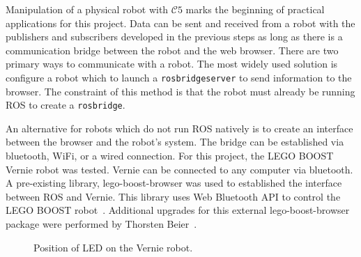         Manipulation of a physical robot with $\mathcal{C}5$ marks the beginning of practical applications for this project. Data can be sent and received from a robot with the publishers and subscribers developed in the previous steps as long as there is a communication bridge between the robot and the web browser. There are two primary ways to communicate with a robot. The most widely used solution is configure a robot which to launch a \texttt{rosbridge\smallunderscore server} to send information to the browser. The constraint of this method is that the robot must already be running \ac{ROS} to create a \texttt{rosbridge}.

        An alternative for robots which do not run \ac{ROS} natively is to create an interface between the browser and the robot's system. The bridge can be established via bluetooth, WiFi, or a wired connection. For this project, the LEGO BOOST Vernie robot was tested. Vernie can be connected to any computer via bluetooth. A pre-existing library, \textsf{lego-boost-browser} was used to established the interface between \ac{ROS} and Vernie. This library uses Web Bluetooth \ac{API} to control the LEGO BOOST robot~\cite{boosted}.  Additional upgrades for this external \textsf{lego-boost-browser} package were performed by Thorsten Beier~\cite{thoboost}.

        
        \begin{figure}[htbp]
            \centering
    
            \caption{Position of \ac{LED} on the Vernie robot.}
            \label{fig:vernie}
        \end{figure}

